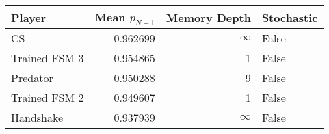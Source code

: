 \begin{tabular}{lrrl}
\toprule
        Player &  Mean $p_{N-1}$ &  Memory Depth & Stochastic \\
\midrule
            CS &        0.962699 &            \(\infty\) &      False \\
 Trained FSM 3 &        0.954865 &             1 &      False \\
      Predator &        0.950288 &             9 &      False \\
 Trained FSM 2 &        0.949607 &             1 &      False \\
     Handshake &        0.937939 &            \(\infty\) &      False \\
\bottomrule
\end{tabular}

